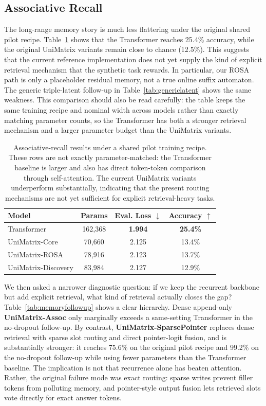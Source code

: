 \documentclass[11pt]{article}
\begin{document}
\subsection{Associative Recall}\label{sec:memoryfollowup}
The long-range memory story is much less flattering under the original shared
pilot recipe. Table~\ref{tab:memory} shows that the Transformer reaches 25.4\%
accuracy, while the original UniMatrix variants remain close to chance
(12.5\%). This suggests that the current reference implementation does not yet
supply the kind of explicit retrieval mechanism that the synthetic task
rewards. In particular, our ROSA path is only a placeholder residual memory,
not a true online suffix automaton. The generic triple-latent follow-up in
Table~\ref{tab:genericlatent} shows the same weakness. This comparison should
also be read carefully: the table keeps the same training recipe and nominal
width across models rather than exactly matching parameter counts, so the
Transformer has both a stronger retrieval mechanism and a larger parameter
budget than the UniMatrix variants.

\begin{table}[t]
\centering
\begin{tabular}{lccc}
\toprule
Model & Params & Eval. Loss $\downarrow$ & Accuracy $\uparrow$ \\
\midrule
Transformer & 162{,}368 & \textbf{1.994} & \textbf{25.4\%} \\
UniMatrix-Core & 70{,}660 & 2.125 & 13.4\% \\
UniMatrix-ROSA & 78{,}916 & 2.123 & 13.7\% \\
UniMatrix-Discovery & 83{,}984 & 2.127 & 12.9\% \\
\bottomrule
\end{tabular}
\caption{Associative-recall results under a shared pilot training recipe. These
rows are not exactly parameter-matched: the Transformer baseline is larger and
also has direct token-token comparison through self-attention. The current
UniMatrix variants underperform substantially, indicating that the present
routing mechanisms are not yet sufficient for explicit retrieval-heavy tasks.}
\label{tab:memory}
\end{table}

We then asked a narrower diagnostic question: if we keep the recurrent
backbone but add explicit retrieval, what kind of retrieval actually closes the
gap? Table~\ref{tab:memoryfollowup} shows a clear hierarchy. Dense append-only
\textbf{UniMatrix-Assoc} only marginally exceeds a same-setting Transformer in
the no-dropout follow-up. By contrast, \textbf{UniMatrix-SparsePointer}
replaces dense retrieval with sparse slot routing and direct pointer-logit
fusion, and is substantially stronger: it reaches 75.6\% on the original pilot
recipe and 99.2\% on the no-dropout follow-up while using fewer parameters
than the Transformer baseline. The implication is not that recurrence alone has
beaten attention. Rather, the original failure mode was exact routing: sparse
writes prevent filler tokens from polluting memory, and pointer-style output
fusion lets retrieved slots vote directly for exact answer tokens.
\end{document}
